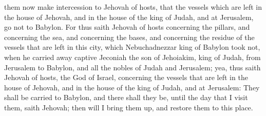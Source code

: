 them now make intercession to Jehovah of hosts, that the vessels which are left in the house of Jehovah, and in the house of the king of Judah, and at Jerusalem, go not to Babylon. For thus saith Jehovah of hosts concerning the pillars, and concerning the sea, and concerning the bases, and concerning the residue of the vessels that are left in this city, which Nebuchadnezzar king of Babylon took not, when he carried away captive Jeconiah the son of Jehoiakim, king of Judah, from Jerusalem to Babylon, and all the nobles of Judah and Jerusalem; yea, thus saith Jehovah of hosts, the God of Israel, concerning the vessels that are left in the house of Jehovah, and in the house of the king of Judah, and at Jerusalem: They shall be carried to Babylon, and there shall they be, until the day that I visit them, saith Jehovah; then will I bring them up, and restore them to this place. 

